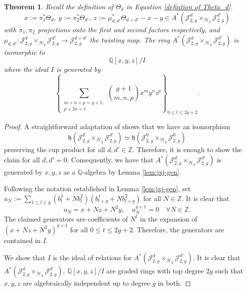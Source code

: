 \documentclass[11pt]{amsart}
\newcommand\Z{\mathbb{Z}}
\newtheorem{theorem}{Theorem}[section]
\theoremstyle{definition}
\newcommand{\p}{\mathbb{P}}
\newcommand{\jac}{\mathcal{J}}
\newcommand{\h}{\mathcal{H}}
\newcommand{\Q}{\mathbb{Q}}
\newcommand{\T}{\Theta}
\begin{document}
\begin{theorem}\label{thm:jxj-rel}
 Recall the definition of $\Theta_d$ in Equation \ref{defintion of Theta_d}.
 $$x:= \pi_1^*\T_d, \ y:= \pi_2^*\T_{d'}, \ z:= \mu_{d,d'}^*\T_{d+d'}-x-y \in A^*(\jac^d_{2,g}\times_{\h_g}\jac^{d'}_{2,g})$$
  with $\pi_1,\pi_2$ projections onto the first and second factors respectively, and $\mu_{d,d'}:\jac^d_{2,g}\times_{\h_g}\jac^{d'}_{2,g} \to \jac^{d+d'}_{2,g}$ the twisting map.
 The ring $A^*(\jac^d_{2,g}\times_{\h_g}\jac^{d'}_{2,g})$ is isomorphic to
$$\Q[x,y,z]/I$$
where the ideal $I$ is generated by 
$$ \left\{{\sum}_{\substack{m+n+p=g+1,\\p+2n=t}}{{g+1}\choose{m,n,p}}x^my^nz^p\right\}_{0\leq t\leq 2g+2}.$$
\end{theorem}
\begin{proof}
A straightforward adaptation of \cite[Theorem A.1]{bae-maulik} shows that we have an isomorphism 
$$\mathfrak{h}({\jac^d_{2,g}\times_{\h_g}\jac^{d'}_{2,g}})\simeq \mathfrak{h}(\jac^0_{2,g}\times_{\h_g}\jac^{0}_{2,g})$$ preserving the cup product for all $d,d'\in \Z$. 
Therefore, it is enough to show the claim for all $d,d'=0$.
Consequently, we have that $A^*(\jac^d_{2,g}\times_{\h_g}\jac^{d'}_{2,g})$ is generated by $x,y,z$ as a $\Q$-algebra by Lemma \ref{lem:jxj-gen}.

Following the notation established in Lemma \ref{lem:jxj-gen}, set $u_N := \sum_{1\leq l\leq g}(b^1_l+Nb^2_l)(b^1_{l+g}+Nb^2_{l+g})$ for all $N\in \Z$.
It is clear that $$u_N = x+Nz+N^2y,\quad u_N^{g+1}=0\quad \forall N\in\Z.$$
The claimed generators are coefficients of $N^t$ in the expansion of $(x+Nz+N^2y)^{g+1}$ for all $0\leq t\leq 2g+2$.
Therefore, the generators are contained in $I$.

We show that $I$ is the ideal of relations for $A^*(\jac^d_{2,g}\times_{\h_g}\jac^{d'}_{2,g})$.
It is clear that $A^*(\jac^d_{2,g}\times_{\h_g}\jac^{d'}_{2,g}), \ \Q[x,y,z]/I$ are graded rings with top degree $2g$ such that $x,y,z$ are algebraically independent up to degree $g$ in both.


\end{proof}
\end{document}
